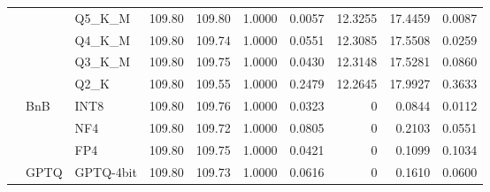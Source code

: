 \begin{longtable}{ll l rrrrrrr}
 &  & Q5\_K\_M & 109.80 & 109.80 & 1.0000 & 0.0057 & 12.3255 & 17.4459 & 0.0087 \\
 &  & Q4\_K\_M & 109.80 & 109.74 & 1.0000 & 0.0551 & 12.3085 & 17.5508 & 0.0259 \\
 &  & Q3\_K\_M & 109.80 & 109.75 & 1.0000 & 0.0430 & 12.3148 & 17.5281 & 0.0860 \\
 &  & Q2\_K & 109.80 & 109.55 & 1.0000 & 0.2479 & 12.2645 & 17.9927 & 0.3633 \\
 & BnB & INT8 & 109.80 & 109.76 & 1.0000 & 0.0323 & \cellcolor{cyan!12} $0$ & 0.0844 & 0.0112 \\
 &  & NF4 & 109.80 & 109.72 & 1.0000 & 0.0805 & \cellcolor{cyan!12} $0$ & 0.2103 & 0.0551 \\
 &  & FP4 & 109.80 & 109.75 & 1.0000 & 0.0421 & \cellcolor{cyan!12} $0$ & 0.1099 & 0.1034 \\
 & GPTQ & GPTQ-4bit & 109.80 & 109.73 & 1.0000 & 0.0616 & \cellcolor{cyan!12} $0$ & 0.1610 & 0.0600 \\
\end{longtable}
\endgroup